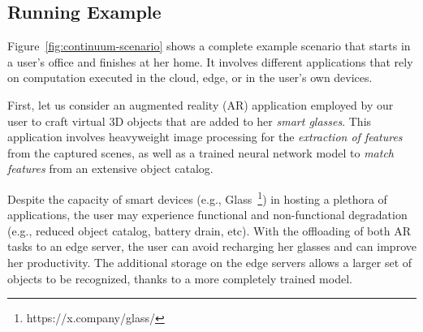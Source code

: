 


\subsection{Running Example}
\label{sub:example}

Figure~\ref{fig:continuum-scenario} shows a complete example scenario that starts in a user's office and finishes at her home. It involves different applications that rely on computation executed in the cloud, edge, or in the user's own devices. 


First, let us consider an augmented reality (AR) application employed by our user to craft virtual 3D objects that are added to her \textit{smart glasses}. This application involves heavyweight image processing for the \textit{extraction of features} from the captured scenes, as well as a trained neural network model to \textit{match features} from an extensive object catalog. 

Despite the capacity of smart devices (e.g., Glass~\footnote{https://x.company/glass/}) in hosting a plethora of applications, the user may experience functional and non-functional degradation (e.g., reduced object catalog, battery drain, etc). With the offloading of both AR tasks to an edge server, the user can avoid recharging her glasses and can improve her productivity. The additional storage on the edge servers allows a larger set of objects to be recognized, thanks to a more completely trained model.

